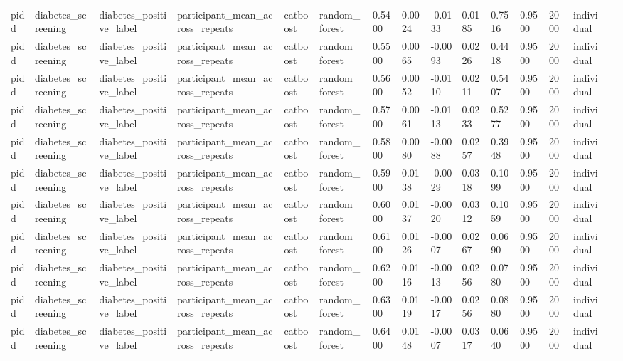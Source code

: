 \begin{tabular}{lllllllllllllll}
pidd & diabetes\_screening & diabetes\_positive\_label & participant\_mean\_across\_repeats & catboost & random\_forest & 0.5400 & 0.0024 & -0.0133 & 0.0185 & 0.7516 & 0.9500 & 2000 & individual &  \\
pidd & diabetes\_screening & diabetes\_positive\_label & participant\_mean\_across\_repeats & catboost & random\_forest & 0.5500 & 0.0065 & -0.0093 & 0.0226 & 0.4418 & 0.9500 & 2000 & individual &  \\
pidd & diabetes\_screening & diabetes\_positive\_label & participant\_mean\_across\_repeats & catboost & random\_forest & 0.5600 & 0.0052 & -0.0110 & 0.0211 & 0.5407 & 0.9500 & 2000 & individual &  \\
pidd & diabetes\_screening & diabetes\_positive\_label & participant\_mean\_across\_repeats & catboost & random\_forest & 0.5700 & 0.0061 & -0.0113 & 0.0233 & 0.5277 & 0.9500 & 2000 & individual &  \\
pidd & diabetes\_screening & diabetes\_positive\_label & participant\_mean\_across\_repeats & catboost & random\_forest & 0.5800 & 0.0080 & -0.0088 & 0.0257 & 0.3948 & 0.9500 & 2000 & individual &  \\
pidd & diabetes\_screening & diabetes\_positive\_label & participant\_mean\_across\_repeats & catboost & random\_forest & 0.5900 & 0.0138 & -0.0029 & 0.0318 & 0.1099 & 0.9500 & 2000 & individual &  \\
pidd & diabetes\_screening & diabetes\_positive\_label & participant\_mean\_across\_repeats & catboost & random\_forest & 0.6000 & 0.0137 & -0.0020 & 0.0312 & 0.1059 & 0.9500 & 2000 & individual &  \\
pidd & diabetes\_screening & diabetes\_positive\_label & participant\_mean\_across\_repeats & catboost & random\_forest & 0.6100 & 0.0126 & -0.0007 & 0.0267 & 0.0690 & 0.9500 & 2000 & individual &  \\
pidd & diabetes\_screening & diabetes\_positive\_label & participant\_mean\_across\_repeats & catboost & random\_forest & 0.6200 & 0.0116 & -0.0013 & 0.0256 & 0.0780 & 0.9500 & 2000 & individual &  \\
pidd & diabetes\_screening & diabetes\_positive\_label & participant\_mean\_across\_repeats & catboost & random\_forest & 0.6300 & 0.0119 & -0.0017 & 0.0256 & 0.0880 & 0.9500 & 2000 & individual &  \\
pidd & diabetes\_screening & diabetes\_positive\_label & participant\_mean\_across\_repeats & catboost & random\_forest & 0.6400 & 0.0148 & -0.0007 & 0.0317 & 0.0640 & 0.9500 & 2000 & individual &  \\

\end{tabular}
